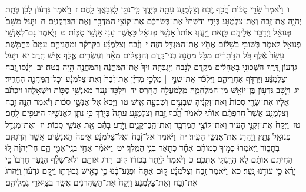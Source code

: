 \documentclass[18pt]{article}
\newcommand{\vart}[1]{\Bfootnote{#1}}	%
\begin{document}
 {\loc ו~}וַיֹּ֙אמֶר֙ שָׂרֵ֣י סֻכּ֔וֹת הֲ֠כַ֠ף זֶ֧בַח וְצַלְמֻנָּ֛ע עַתָּ֖ה בְּיָדֶ֑ךָ כִּֽי־נִתֵּ֥ן לִֽצְבָאֲךָ֖ לָֽחֶם׃ \startlock
 {\loc ז~}וַיֹּ֣אמֶר גִּדְע֔וֹן לָכֵ֗ן בְּתֵ֧ת יְהֹוָ֛ה אֶת־זֶ֥בַח וְאֶת־צַלְמֻנָּ֖ע בְּיָדִ֑י וְדַשְׁתִּי֙ אֶת־בְּשַׂרְכֶ֔ם אֶת־קוֹצֵ֥י הַמִּדְבָּ֖ר וְאֶת־הַֽבַּרְקֳנִֽים׃ \startlock
 {\loc ח~}וַיַּ֤עַל מִשָּׁם֙ פְּנוּאֵ֔ל וַיְדַבֵּ֥ר אֲלֵיהֶ֖ם כָּזֹ֑את וַיַּעֲנ֤וּ אוֹתוֹ֙ אַנְשֵׁ֣י פְנוּאֵ֔ל כַּאֲשֶׁ֥ר עָנ֖וּ אַנְשֵׁ֥י סֻכּֽוֹת׃ \startlock
 {\loc ט~}וַיֹּ֛אמֶר גַּם־לְאַנְשֵׁ֥י פְנוּאֵ֖ל לֵאמֹ֑ר בְּשׁוּבִ֣י בְשָׁל֔וֹם אֶתֹּ֖ץ אֶת־הַמִּגְדָּ֥ל הַזֶּֽה׃ \startlock
 {\loc י~}וְזֶ֨בַח וְצַלְמֻנָּ֜ע בַּקַּרְקֹ֗ר וּמַחֲנֵיהֶ֤ם עִמָּם֙ כַּחֲמֵ֤שֶׁת עָשָׂר֙ אֶ֔לֶף כֹּ֚ל הַנּ֣וֹתָרִ֔ים מִכֹּ֖ל מַחֲנֵ֣ה בְנֵי־קֶ֑דֶם וְהַנֹּ֣פְלִ֔ים מֵאָ֨ה וְעֶשְׂרִ֥ים אֶ֛לֶף אִ֖ישׁ  \edtext{שֹׁ֥לֵֽף}{\vart{א=שֹׁ֥לֵֽף־ (במקף) | }}  חָֽרֶב׃ \startlock
 {\loc יא~}וַיַּ֣עַל גִּדְע֗וֹן דֶּ֚רֶךְ הַשְּׁכוּנֵ֣י  בׇאֳהָלִ֔ים  מִקֶּ֥דֶם לְנֹ֖בַח וְיׇגְבְּהָ֑ה וַיַּךְ֙ אֶת־הַֽמַּחֲנֶ֔ה וְהַֽמַּחֲנֶ֖ה הָ֥יָה בֶֽטַח׃ \startlock
 {\loc יב~}וַיָּנֻ֗סוּ זֶ֚בַח וְצַלְמֻנָּ֔ע וַיִּרְדֹּ֖ף אַחֲרֵיהֶ֑ם וַיִּלְכֹּ֞ד אֶת־שְׁנֵ֣י  |  מַלְכֵ֣י מִדְיָ֗ן אֶת־זֶ֙בַח֙ וְאֶת־צַלְמֻנָּ֔ע וְכׇל־הַֽמַּחֲנֶ֖ה הֶחֱרִֽיד׃ \startlock
 {\loc יג~}וַיָּ֛שׇׁב גִּדְע֥וֹן בֶּן־יוֹאָ֖שׁ מִן־הַמִּלְחָמָ֑ה מִֽלְמַעֲלֵ֖ה הֶחָֽרֶס׃ \startlock
 {\loc יד~}וַיִּלְכׇּד־נַ֛עַר מֵאַנְשֵׁ֥י סֻכּ֖וֹת וַיִּשְׁאָלֵ֑הוּ וַיִּכְתֹּ֨ב אֵלָ֜יו אֶת־שָׂרֵ֤י סֻכּוֹת֙ וְאֶת־זְקֵנֶ֔יהָ שִׁבְעִ֥ים וְשִׁבְעָ֖ה אִֽישׁ׃ \startlock
 {\loc טו~}וַיָּבֹא֙ אֶל־אַנְשֵׁ֣י סֻכּ֔וֹת וַיֹּ֕אמֶר הִנֵּ֖ה זֶ֣בַח וְצַלְמֻנָּ֑ע אֲשֶׁר֩ חֵרַפְתֶּ֨ם אוֹתִ֜י לֵאמֹ֗ר הֲ֠כַ֠ף זֶ֣בַח וְצַלְמֻנָּ֤ע עַתָּה֙ בְּיָדֶ֔ךָ כִּ֥י נִתֵּ֛ן לַאֲנָשֶׁ֥יךָ הַיְּעֵפִ֖ים לָֽחֶם׃ \startlock
 {\loc טז~}וַיִּקַּח֙ אֶת־זִקְנֵ֣י הָעִ֔יר וְאֶת־קוֹצֵ֥י הַמִּדְבָּ֖ר וְאֶת־הַֽבַּרְקֳנִ֑ים וַיֹּ֣דַע בָּהֶ֔ם אֵ֖ת אַנְשֵׁ֥י סֻכּֽוֹת׃ \startlock
 {\loc יז~}וְאֶת־מִגְדַּ֥ל פְּנוּאֵ֖ל נָתָ֑ץ וַֽיַּהֲרֹ֖ג אֶת־אַנְשֵׁ֥י הָעִֽיר׃ \startlock
 {\loc יח~}וַיֹּ֗אמֶר אֶל־זֶ֙בַח֙ וְאֶל־צַלְמֻנָּ֔ע אֵיפֹה֙ הָאֲנָשִׁ֔ים אֲשֶׁ֥ר הֲרַגְתֶּ֖ם בְּתָב֑וֹר וַיֹּֽאמְרוּ֙ כָּמ֣וֹךָ כְמוֹהֶ֔ם אֶחָ֕ד כְּתֹ֖אַר בְּנֵ֥י הַמֶּֽלֶךְ׃ \startlock
 {\loc יט~}וַיֹּאמַ֕ר אַחַ֥י בְּנֵֽי־אִמִּ֖י הֵ֑ם חַי־יְהֹוָ֗ה ל֚וּ הַחֲיִתֶ֣ם אוֹתָ֔ם לֹ֥א הָרַ֖גְתִּי אֶתְכֶֽם׃ \startlock
 {\loc כ~}וַיֹּ֙אמֶר֙ לְיֶ֣תֶר בְּכוֹר֔וֹ ק֖וּם הֲרֹ֣ג אוֹתָ֑ם וְלֹא־שָׁלַ֨ף הַנַּ֤עַר חַרְבּוֹ֙ כִּ֣י יָרֵ֔א כִּ֥י עוֹדֶ֖נּוּ נָֽעַר׃ \startlock
 {\loc כא~}וַיֹּ֜אמֶר זֶ֣בַח וְצַלְמֻנָּ֗ע ק֤וּם אַתָּה֙ וּפְגַע־בָּ֔נוּ כִּ֥י כָאִ֖ישׁ גְּבוּרָת֑וֹ וַיָּ֣קׇם גִּדְע֗וֹן וַֽיַּהֲרֹג֙ אֶת־זֶ֣בַח וְאֶת־צַלְמֻנָּ֔ע וַיִּקַּח֙ אֶת־הַשַּׂ֣הֲרֹנִ֔ים אֲשֶׁ֖ר בְּצַוְּארֵ֥י גְמַלֵּיהֶֽם׃ \startlock
\end{document}

